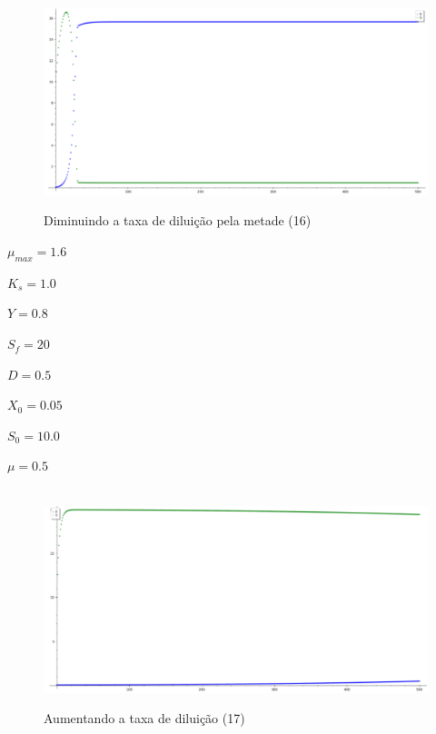 \documentclass{article}
\begin{document}
\begin{figure}[H]
        \centering
        \hbox{\hspace{1.0em} \includegraphics[scale=0.5]{Modelo_16.png}} 
        \caption*{Diminuindo a taxa de diluição pela metade (16)}
\end{figure}
\vspace{-7mm}
\begin{itemize}
\begin{multicols}{4}
    \item $\mu_{max} = 1.6$ 
    \item $K_s = 1.0$ 
\columnbreak    
    \item $Y = 0.8$ 
    \item $S_f = 20$ 
\columnbreak    
    \item $D = 0.5$ 
    \item $X_0 = 0.05$ 
\columnbreak    
    \item $S_0 = 10.0$ 
    \item $\mu = 0.5$
\end{multicols}
\end{itemize} 
\begin{figure}[H]
        \centering
        \hbox{\hspace{1.0em} \includegraphics[scale=0.5]{Modelo_17.png}} 
        \caption*{Aumentando a taxa de diluição (17)}
\end{figure}
\end{document}
